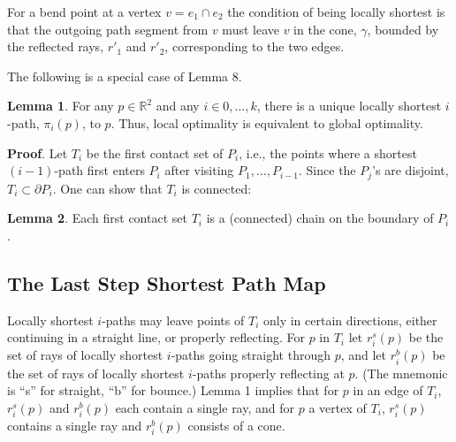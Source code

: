 \documentclass[a4paper]{article}
\begin{document}
For a bend point at a vertex \(v = e_1 \cap e_2\) the condition of being locally shortest is that the outgoing path segment from \(v\) must leave \(v\) in the cone, \(\gamma\), bounded by the reflected rays, \(r'_1\) and \(r'_2\), corresponding to the two edges.

The following is a special case of Lemma 8.

\textbf{Lemma 1}. For any \(p \in \mathbb{R} ^ 2\) and any \(i \in {0, \dots, k}\), there is a unique locally shortest \(i\)-path, \(\pi_i(p)\), to \(p\). Thus, local optimality is equivalent to global optimality.

\textbf{Proof}. Let \(T_i\) be the first contact set of \(P_i\), i.e., the points where a shortest \((i-1)\)-path first enters \(P_i\) after visiting \(P_1, \dots, P_{i - 1}\). Since the \(P_j\)'s are disjoint, \(T_i \subset \partial P_i\). One can show that \(T_i\) is connected:	

\textbf{Lemma 2}. Each first contact set \(T_i\) is a (connected) chain on the boundary of \(P_i\).

\subsection{The Last Step Shortest Path Map}

Locally shortest \(i\)-paths may leave points of \(T_i\) only in certain directions, either continuing in a straight line, or properly reflecting. For \(p\) in \(T_i\) let \(r^s_i(p)\) be the set of rays of locally shortest \(i\)-paths going straight through \(p\), and let \(r^b_i(p)\) be the set of rays of locally shortest \(i\)-paths properly reflecting at \(p\). (The mnemonic is “s” for straight, “b” for bounce.) Lemma 1 implies that for \(p\) in an edge of \(T_i\), \(r^s_i(p)\) and \(r^b_i(p)\) each contain a single ray, and for \(p\) a vertex of \(T_i\), \(r^s_i(p)\) contains a single ray and \(r^b_i(p)\) consists of a cone.
\end{document}
